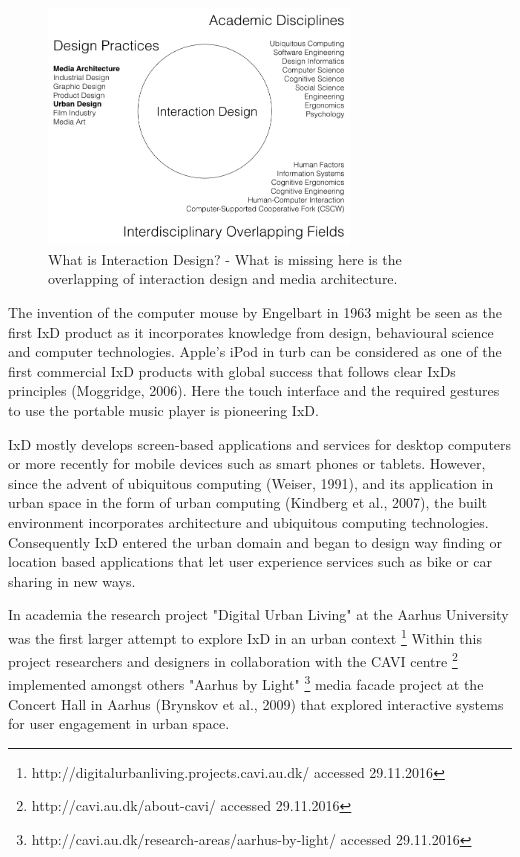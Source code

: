   \begin{figure}[h!]
  \centering
  \includegraphics[width=8cm]{Illustrations/Interaction-Design-Fields.png}
  \caption{What is Interaction Design? \cite{Rogers Interaction Design - beyond HCI 4th Edition p. 9} - What is missing here is the overlapping of interaction design and media architecture.}
  \label{DesignFields}
  \end{figure}

The invention of the computer mouse by Engelbart in 1963 might be seen as the first IxD product as it incorporates knowledge from design, behavioural science and computer technologies.   
Apple's iPod in turb can be considered as one of the first commercial IxD products with global success that follows clear IxDs principles (Moggridge, 2006). Here the touch interface and the required gestures to use the portable music player is pioneering IxD. 

IxD mostly develops screen-based applications and services for desktop computers or more recently for mobile devices such as smart phones or tablets. However, since the advent of ubiquitous computing (Weiser, 1991), and its application in urban space in the form of urban computing (Kindberg et al., 2007), the built environment incorporates architecture and ubiquitous computing technologies. Consequently IxD entered the urban domain and began to design way finding or location based applications that let user experience services such as bike or car sharing in new ways.

In academia the research project "Digital Urban Living" at the Aarhus University was the first larger attempt to explore IxD in an urban context \footnote{http://digitalurbanliving.projects.cavi.au.dk/ accessed 29.11.2016} Within this project researchers and designers in collaboration with the CAVI centre \footnote{http://cavi.au.dk/about-cavi/ accessed 29.11.2016} implemented amongst others "Aarhus by Light" \footnote{http://cavi.au.dk/research-areas/aarhus-by-light/ accessed 29.11.2016} media facade project at the Concert Hall in Aarhus (Brynskov et al., 2009) that explored interactive systems for user engagement in urban space.

